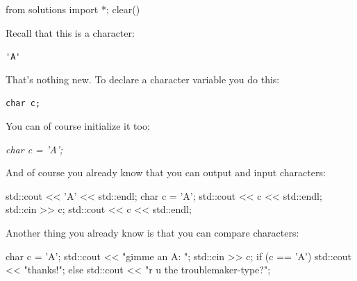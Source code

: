 \begin{python0}
from solutions import *; clear()
\end{python0}

Recall that this is a character:

\begin{center}
\verb!'A'!
\end{center}

That's nothing new. To declare a character variable you do this:

\begin{center}
\texttt{char c;}
\end{center}

You can of course initialize it too:

\begin{center}
\textit{char c = 'A';}
\end{center}

And of course you already know that you can output and input characters:

\begin{consolethree}[escapeinside=||]
std::cout << 'A' << std::endl;
char c = 'A';
std::cout << c << std::endl;
std::cin >> c;
std::cout << c << std::endl;
\end{consolethree}

Another thing you already know is that you can compare characters:

\begin{consolethree}[escapeinside=||]
char c = 'A';
std::cout << "gimme an A: ";
std::cin >> c;
if (c == 'A')
{
    std::cout << "thanks!";
}
else
{
    std::cout << "r u the troublemaker-type?";
}
\end{consolethree}


